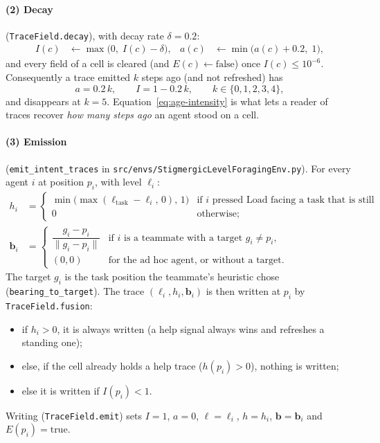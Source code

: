 \documentclass[11pt,a4paper]{article}
\newcommand{\file}{\nolinkurl}  %
\newcommand{\code}[1]{\texttt{#1}}
\theoremstyle{remark}
\begin{document}
\paragraph{(2) Decay} (\code{TraceField.decay}), with decay rate $\delta = 0.2$:
\begin{align}
  I(c) &\leftarrow \max\bigl(0,\; I(c) - \delta\bigr), &
  a(c) &\leftarrow \min\bigl(a(c) + 0.2,\; 1\bigr),
\end{align}
and every field of a cell is cleared (and $E(c)\leftarrow\text{false}$) once $I(c)\le 10^{-6}$. Consequently a trace
emitted $k$ steps ago (and not refreshed) has
\begin{equation}
  a = 0.2\,k, \qquad I = 1 - 0.2\,k, \qquad k\in\{0,1,2,3,4\},
  \label{eq:age-intensity}
\end{equation}
and disappears at $k=5$. Equation~\eqref{eq:age-intensity} is what lets a reader of traces recover \emph{how many steps
ago} an agent stood on a cell.

\paragraph{(3) Emission} (\code{emit\_intent\_traces} in \file{src/envs/StigmergicLevelForagingEnv.py}). For every agent
$i$ at position $p_i$, with level $\ell_i$:
\begin{align}
  h_i &= \begin{cases}
     \min\bigl(\max(\ell_{\text{task}} - \ell_i,\,0),\,1\bigr) & \text{if $i$ pressed Load facing a task that is still there,}\\
     0 & \text{otherwise;}
  \end{cases} \label{eq:help}\\
  \mathbf b_i &= \begin{cases}
     \dfrac{g_i - p_i}{\lVert g_i - p_i\rVert} & \text{if $i$ is a teammate with a target $g_i \ne p_i$,}\\[6pt]
     (0,0) & \text{for the ad hoc agent, or without a target.}
  \end{cases} \label{eq:bearing}
\end{align}
The target $g_i$ is the task position the teammate's heuristic chose (\code{bearing\_to\_target}). The trace
$(\ell_i, h_i, \mathbf b_i)$ is then written at $p_i$ by \code{TraceField.fusion}:
\begin{itemize}[nosep]
  \item if $h_i>0$, it is always written (a help signal always wins and refreshes a standing one);
  \item else, if the cell already holds a help trace ($h(p_i)>0$), nothing is written;
  \item else it is written if $I(p_i) < 1$.
\end{itemize}
Writing (\code{TraceField.emit}) sets $I=1$, $a=0$, $\ell=\ell_i$, $h=h_i$, $\mathbf b=\mathbf b_i$ and $E(p_i)=\text{true}$.
\end{document}
